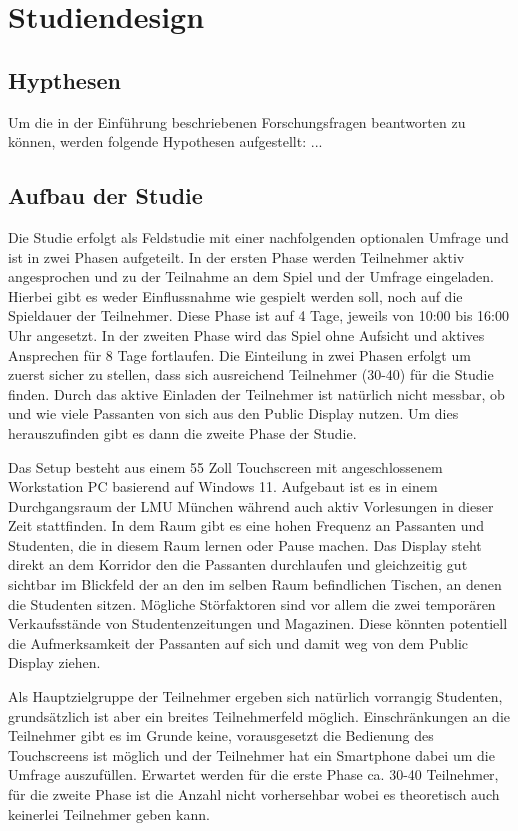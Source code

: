 \chapter{Studiendesign}
\section{Hypthesen}
Um die in der Einführung beschriebenen Forschungsfragen beantworten zu können, werden folgende Hypothesen aufgestellt:
...
\section{Aufbau der Studie}
Die Studie erfolgt als Feldstudie mit einer nachfolgenden optionalen Umfrage und ist in zwei Phasen aufgeteilt. 
In der ersten Phase werden Teilnehmer aktiv angesprochen und zu der Teilnahme an dem Spiel und der Umfrage eingeladen. 
Hierbei gibt es weder Einflussnahme wie gespielt werden soll, noch auf die Spieldauer der Teilnehmer. 
Diese Phase ist auf 4 Tage, jeweils von 10:00 bis 16:00 Uhr angesetzt. 
In der zweiten Phase wird das Spiel ohne Aufsicht und aktives Ansprechen für 8 Tage fortlaufen. 
Die Einteilung in zwei Phasen erfolgt um zuerst sicher zu stellen, dass sich ausreichend Teilnehmer (30-40) für die Studie finden. 
Durch das aktive Einladen der Teilnehmer ist natürlich nicht messbar, ob und wie viele Passanten von sich aus den Public Display nutzen. 
Um dies herauszufinden gibt es dann die zweite Phase der Studie.

Das Setup besteht aus einem 55 Zoll Touchscreen mit angeschlossenem Workstation PC basierend auf Windows 11. 
Aufgebaut ist es in einem Durchgangsraum der LMU München während auch aktiv Vorlesungen in dieser Zeit stattfinden. 
In dem Raum gibt es eine hohen Frequenz an Passanten und Studenten, die in diesem Raum lernen oder Pause machen. 
Das Display steht direkt an dem Korridor den die Passanten durchlaufen und gleichzeitig gut sichtbar im Blickfeld der an den im selben Raum befindlichen Tischen, 
an denen die Studenten sitzen. Mögliche Störfaktoren sind vor allem die zwei temporären Verkaufsstände von Studentenzeitungen und Magazinen. 
Diese könnten potentiell die Aufmerksamkeit der Passanten auf sich und damit weg von dem Public Display ziehen.

Als Hauptzielgruppe der Teilnehmer ergeben sich natürlich vorrangig Studenten, grundsätzlich ist aber ein breites Teilnehmerfeld möglich. 
Einschränkungen an die Teilnehmer gibt es im Grunde keine, vorausgesetzt die Bedienung des Touchscreens ist möglich und der Teilnehmer hat ein Smartphone dabei um die Umfrage auszufüllen. 
Erwartet werden für die erste Phase ca. 30-40 Teilnehmer, für die zweite Phase ist die Anzahl nicht vorhersehbar wobei es theoretisch auch keinerlei Teilnehmer geben kann.

